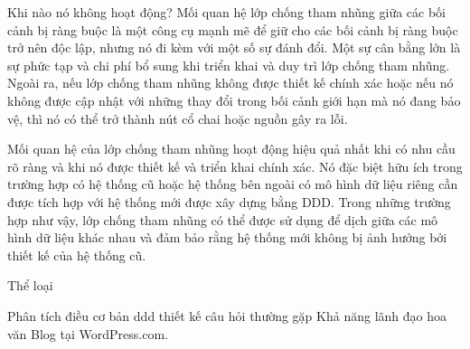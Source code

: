 Khi nào nó không hoạt động?
Mối quan hệ lớp chống tham nhũng giữa các bối cảnh bị ràng buộc là một công cụ mạnh mẽ để giữ cho các bối cảnh bị ràng buộc trở nên độc lập, nhưng nó đi kèm với một số sự đánh đổi. Một sự cân bằng lớn là sự phức tạp và chi phí bổ sung khi triển khai và duy trì lớp chống tham nhũng. Ngoài ra, nếu lớp chống tham nhũng không được thiết kế chính xác hoặc nếu nó không được cập nhật với những thay đổi trong bối cảnh giới hạn mà nó đang bảo vệ, thì nó có thể trở thành nút cổ chai hoặc nguồn gây ra lỗi.

Mối quan hệ của lớp chống tham nhũng hoạt động hiệu quả nhất khi có nhu cầu rõ ràng và khi nó được thiết kế và triển khai chính xác. Nó đặc biệt hữu ích trong trường hợp có hệ thống cũ hoặc hệ thống bên ngoài có mô hình dữ liệu riêng cần được tích hợp với hệ thống mới được xây dựng bằng DDD. Trong những trường hợp như vậy, lớp chống tham nhũng có thể được sử dụng để dịch giữa các mô hình dữ liệu khác nhau và đảm bảo rằng hệ thống mới không bị ảnh hưởng bởi thiết kế của hệ thống cũ.


Thể loại

Phân tích
điều cơ bản
ddd
thiết kế
câu hỏi thường gặp
Khả năng lãnh đạo
hoa văn
Blog tại WordPress.com.
